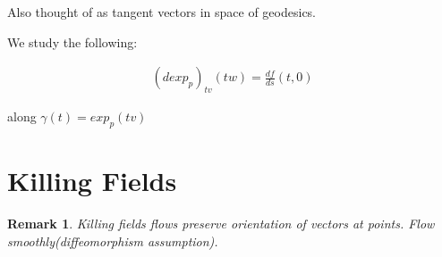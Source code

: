 \documentclass[11pt]{article}
\newtheorem{rem}{Remark}
\begin{document}
Also thought of as tangent vectors in space of geodesics.

We study the following:

\begin{align*}
	(d exp_p)_{tv}(tw) = \frac{df}{ds}(t,0) 
\end{align*}

along $\gamma(t) = exp_p(tv)$

\section{Killing Fields}

\begin{rem}
	Killing fields flows preserve orientation of vectors at points. Flow smoothly(diffeomorphism assumption).
\end{rem}
\end{document}
